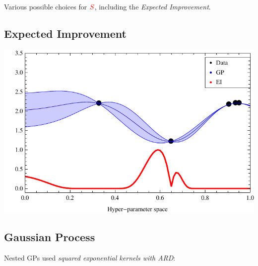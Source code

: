 \documentclass[12pt]{scrartcl}
\newcommand{\red}[1]{\textcolor{red}{#1}}
\newcommand{\un}[1]{\emph{#1}}
\begin{document}
Various possible choices for $\red{S}$, including the \un{Expected
  Improvement}.


\columnbreak

\subsection*{Expected Improvement}
\includegraphics[width = .8\colwidth]{figures/gpei.pdf}




\subsection*{Gaussian Process}

Nested GPs used \un{squared exponential kernels with ARD}:\\
\end{document}

